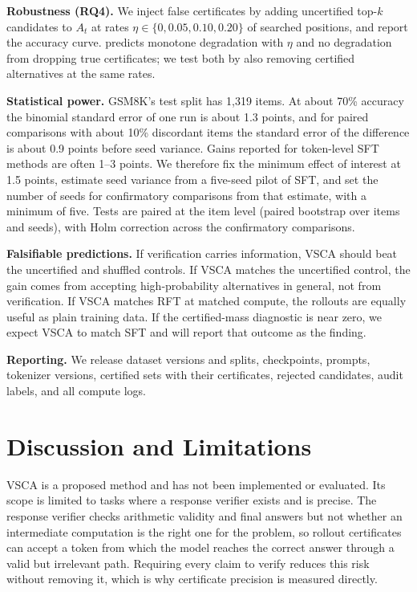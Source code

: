 \documentclass{article}
\newcommand{\vsca}{\textsc{VSCA}}
\newcommand{\acc}{A}
\theoremstyle{plain}
\theoremstyle{remark}
\begin{document}
\textbf{Robustness (RQ4).} We inject false certificates by adding uncertified top-$k$ candidates to $\acc_t$ at rates $\eta\in\{0,0.05,0.10,0.20\}$ of searched positions, and report the accuracy curve.  predicts monotone degradation with $\eta$ and no degradation from dropping true certificates; we test both by also removing certified alternatives at the same rates.

\textbf{Statistical power.} GSM8K's test split has 1{,}319 items. At about 70\% accuracy the binomial standard error of one run is about 1.3 points, and for paired comparisons with about 10\% discordant items the standard error of the difference is about 0.9 points before seed variance. Gains reported for token-level SFT methods are often 1--3 points. We therefore fix the minimum effect of interest at 1.5 points, estimate seed variance from a five-seed pilot of SFT, and set the number of seeds for confirmatory comparisons from that estimate, with a minimum of five. Tests are paired at the item level (paired bootstrap over items and seeds), with Holm correction across the confirmatory comparisons.

\textbf{Falsifiable predictions.} If verification carries information, \vsca{} should beat the uncertified and shuffled controls. If \vsca{} matches the uncertified control, the gain comes from accepting high-probability alternatives in general, not from verification. If \vsca{} matches RFT at matched compute, the rollouts are equally useful as plain training data. If the certified-mass diagnostic is near zero, we expect \vsca{} to match SFT and will report that outcome as the finding.

\textbf{Reporting.} We release dataset versions and splits, checkpoints, prompts, tokenizer versions, certified sets with their certificates, rejected candidates, audit labels, and all compute logs.

\section{Discussion and Limitations}
\label{sec:discussion}
\vsca{} is a proposed method and has not been implemented or evaluated. Its scope is limited to tasks where a response verifier exists and is precise. The response verifier checks arithmetic validity and final answers but not whether an intermediate computation is the right one for the problem, so rollout certificates can accept a token from which the model reaches the correct answer through a valid but irrelevant path. Requiring every claim to verify reduces this risk without removing it, which is why certificate precision is measured directly.
\end{document}

